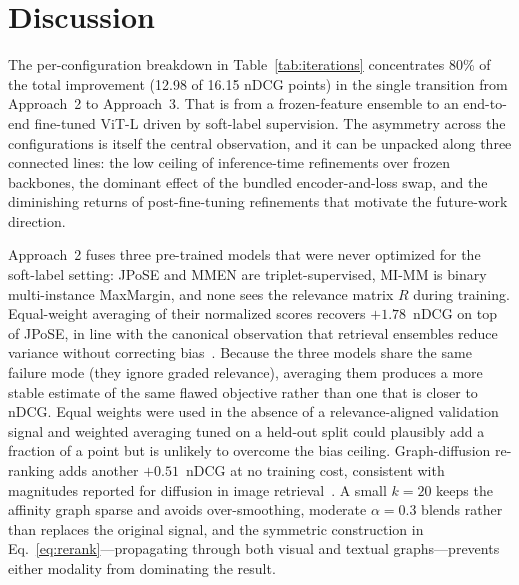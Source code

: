 \section{Discussion}
\label{sec:discussion}

The per-configuration breakdown in Table~\ref{tab:iterations} concentrates 80\% of the total improvement (12.98 of 16.15 nDCG points) in the single transition from Approach~2 to Approach~3. That is from a frozen-feature ensemble to an end-to-end fine-tuned ViT-L driven by soft-label supervision. The asymmetry across the configurations is itself the central observation, and it can be unpacked along three connected lines: the low ceiling of inference-time refinements over frozen backbones, the dominant effect of the bundled encoder-and-loss swap, and the diminishing returns of post-fine-tuning refinements that motivate the future-work direction.

Approach~2 fuses three pre-trained models that were never optimized for the soft-label setting: JPoSE and MMEN are triplet-supervised, MI-MM is binary multi-instance MaxMargin, and none sees the relevance matrix $R$ during training. Equal-weight averaging of their normalized scores recovers $+1.78$~nDCG on top of JPoSE, in line with the canonical observation that retrieval ensembles reduce variance without correcting bias~\cite{wortsman2022modelsoups}. Because the three models share the same failure mode (they ignore graded relevance), averaging them produces a more stable estimate of the same flawed objective rather than one that is closer to nDCG. Equal weights were used in the absence of a relevance-aligned validation signal and weighted averaging tuned on a held-out split could plausibly add a fraction of a point but is unlikely to overcome the bias ceiling. Graph-diffusion re-ranking adds another $+0.51$~nDCG at no training cost, consistent with magnitudes reported for diffusion in image retrieval~\cite{iscen2017diffusion}. A small $k=20$ keeps the affinity graph sparse and avoids over-smoothing, moderate $\alpha=0.3$ blends rather than replaces the original signal, and the symmetric construction in Eq.~\eqref{eq:rerank}---propagating through both visual and textual graphs---prevents either modality from dominating the result.

